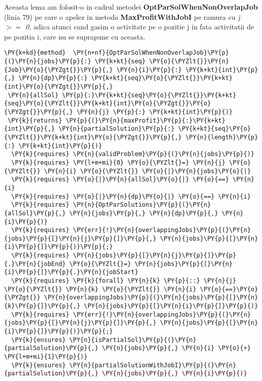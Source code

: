 Aceasta lema am folosit-o in cadrul metodei \textbf{OptParSolWhenNonOverlapJob} (linia 79) pe care o apelez in metoda \textbf{MaxProfitWithJobI}  pe ramura cu \textit{j $>=$ 0}, adica atunci cand gasim o activitate pe o pozitie j in fata activitatii de pe pozitia i, care nu se suprapune cu aceasta. 
\begin{Verbatim}[commandchars=\\\{\}, fontsize=\small]
\PY{k+kd}{method}  \PY{n+nf}{OptParSolWhenNonOverlapJob}\PY{p}{(}\PY{n}{jobs}\PY{p}{:} \PY{k+kt}{seq} \PY{o}{\PYZlt{}}\PY{n}{Job}\PY{o}{\PYZgt{}}\PY{p}{,} \PY{n}{i}\PY{p}{:} \PY{k+kt}{int}\PY{p}{,} \PY{n}{dp}\PY{p}{:} \PY{k+kt}{seq}\PY{o}{\PYZlt{}}\PY{k+kt}{int}\PY{o}{\PYZgt{}}\PY{p}{,}
 \PY{n}{allSol} \PY{p}{:}\PY{k+kt}{seq}\PY{o}{\PYZlt{}}\PY{k+kt}{seq}\PY{o}{\PYZlt{}}\PY{k+kt}{int}\PY{o}{\PYZgt{}}\PY{o}{\PYZgt{}}\PY{p}{,} \PY{n}{j} \PY{p}{:} \PY{k+kt}{int}\PY{p}{)}
 \PY{k}{returns} \PY{p}{(}\PY{n}{maxProfit}\PY{p}{:}\PY{k+kt}{int}\PY{p}{,} \PY{n}{partialSolution}\PY{p}{:} \PY{k+kt}{seq}\PY{o}{\PYZlt{}}\PY{k+kt}{int}\PY{o}{\PYZgt{}}\PY{p}{,} \PY{n}{length}\PY{p}{:} \PY{k+kt}{int}\PY{p}{)}
  \PY{k}{requires} \PY{n}{validProblem}\PY{p}{(}\PY{n}{jobs}\PY{p}{)}
  \PY{k}{requires} \PY{l+m+mi}{0} \PY{o}{\PYZlt{}=} \PY{n}{j} \PY{o}{\PYZlt{}} \PY{n}{i} \PY{o}{\PYZlt{}} \PY{o}{|}\PY{n}{jobs}\PY{o}{|}
  \PY{k}{requires} \PY{o}{|}\PY{n}{allSol}\PY{o}{|} \PY{o}{==} \PY{n}{i}
  \PY{k}{requires} \PY{o}{|}\PY{n}{dp}\PY{o}{|} \PY{o}{==} \PY{n}{i}
  \PY{k}{requires} \PY{n}{OptParSolutions}\PY{p}{(}\PY{n}{allSol}\PY{p}{,} \PY{n}{jobs}\PY{p}{,} \PY{n}{dp}\PY{p}{,} \PY{n}{i}\PY{p}{)}
  \PY{k}{requires} \PY{err}{!}\PY{n}{overlappingJobs}\PY{p}{(}\PY{n}{jobs}\PY{p}{[}\PY{n}{j}\PY{p}{]}\PY{p}{,} \PY{n}{jobs}\PY{p}{[}\PY{n}{i}\PY{p}{]}\PY{p}{)}\PY{p}{;}
  \PY{k}{requires} \PY{n}{jobs}\PY{p}{[}\PY{n}{j}\PY{p}{]}\PY{p}{.}\PY{n}{jobEnd} \PY{o}{\PYZlt{}=} \PY{n}{jobs}\PY{p}{[}\PY{n}{i}\PY{p}{]}\PY{p}{.}\PY{n}{jobStart}
  \PY{k}{requires} \PY{k}{forall} \PY{n}{k} \PY{p}{::} \PY{n}{j} \PY{o}{\PYZlt{}} \PY{n}{k} \PY{o}{\PYZlt{}} \PY{n}{i} \PY{o}{==}\PY{o}{\PYZgt{}} \PY{n}{overlappingJobs}\PY{p}{(}\PY{n}{jobs}\PY{p}{[}\PY{n}{k}\PY{p}{]}\PY{p}{,} \PY{n}{jobs}\PY{p}{[}\PY{n}{i}\PY{p}{]}\PY{p}{)} 
  \PY{k}{requires} \PY{err}{!}\PY{n}{overlappingJobs}\PY{p}{(}\PY{n}{jobs}\PY{p}{[}\PY{n}{j}\PY{p}{]}\PY{p}{,} \PY{n}{jobs}\PY{p}{[}\PY{n}{i}\PY{p}{]}\PY{p}{)}\PY{p}{;}
  \PY{k}{ensures} \PY{n}{isPartialSol}\PY{p}{(}\PY{n}{partialSolution}\PY{p}{,} \PY{n}{jobs}\PY{p}{,} \PY{n}{i} \PY{o}{+} \PY{l+m+mi}{1}\PY{p}{)}
  \PY{k}{ensures} \PY{n}{partialSolutionWithJobI}\PY{p}{(}\PY{n}{partialSolution}\PY{p}{,} \PY{n}{jobs}\PY{p}{,} \PY{n}{i}\PY{p}{)}

\end{Verbatim}

